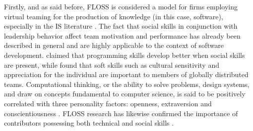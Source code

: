 Firstly, and as said before, FLOSS is considered a model for firms employing virtual teaming for the production of knowledge (in this case, software), especially in the IS literature \citep{Fitzgerald06}. The fact that social skills in conjunction with leadership behavior affect team motivation and performance has already been described in general and are highly applicable to the context of software development. \cite{Moreno-Leonetal16} claimed that programming skills develop better when social skills are present, while \cite{beecham2015motivates} found that soft skills such as cultural sensitivity and appreciation for the individual are important to members of globally distributed teams. Computational thinking, or the ability to solve problems, design systems, and draw on concepts fundamental to computer science, is said to be positively correlated with three personality factors: openness, extraversion and conscientiousness \citep{gonzales:2016:does}. FLOSS research has likewise confirmed the importance of contributors possessing both technical and social skills \citep{david:2007:free,zhou:2012:what,carillo:2014:only,steinmacher:2015:systematic,wei:2016:roles,poo:2016:herding,carillo:2017:what}. 



